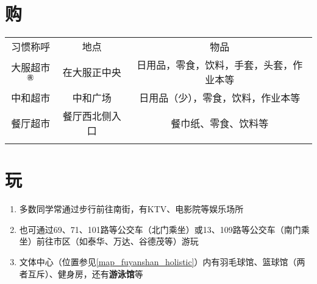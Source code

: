 \section[购]{购}
\label{market}
\begin{table}[H]
    \centering
    \begin{tabular}{|c|c|c|}
        \Xhline{1.2pt}
        习惯称呼       & 地点      & 物品                   \\
        \Xhline{1.2pt}
        大服超市$^{㊰}$ & 在大服正中央  & 日用品，零食，饮料，手套，头套，作业本等 \\
        \hline
        中和超市       & 中和广场    & 日用品（少），零食，饮料，作业本等    \\
        \hline
        餐厅超市       & 餐厅西北侧入口 & 餐巾纸、零食、饮料等           \\
        \Xhline{1.2pt}
    \end{tabular}
\end{table}

\section[玩]{玩}
\begin{enumerate}
    \item 多数同学常通过步行前往南街，有KTV、电影院等娱乐场所
    \item 也可通过69、71、101路等公交车（北门乘坐）或13、109路等公交车（南门乘坐）前往市区（如泰华、万达、谷德茂等）游玩
    \item 文体中心（位置参见\uline{\ref{map_fuyanshan_holistic}}）内有羽毛球馆、篮球馆（两者互斥）、健身房，还有\textbf{游泳馆}等\footnotemark
\end{enumerate}


